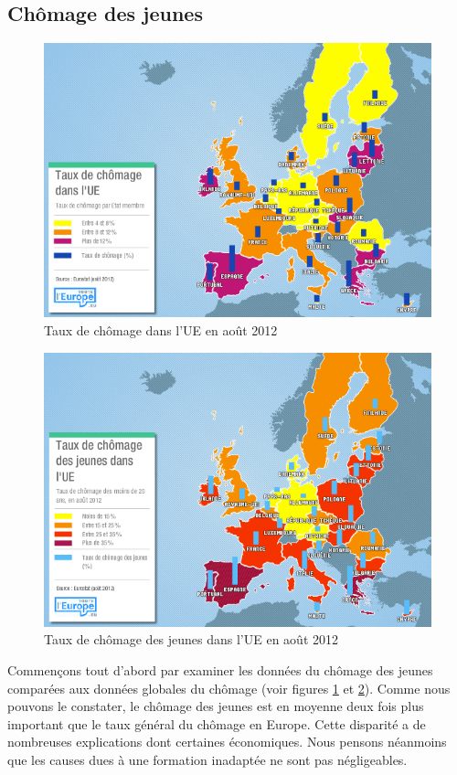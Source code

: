 \subsection{Chômage des jeunes}
\begin{figure}[p]
\centering
\includegraphics[width=0.98\linewidth]{../resources/illustrations/chom}
\caption{Taux de chômage dans l'UE en août 2012 \cite{chom}}
\label{chom}
\end{figure}
\begin{figure}[p]
\centering
\includegraphics[width=0.98\linewidth]{../resources/illustrations/chom_jeunes}
\caption{Taux de chômage des jeunes dans l'UE en août 2012 \cite{chom_jeunes}}
\label{chom_jeunes}
\end{figure}
Commençons tout d'abord par examiner les données du chômage des jeunes comparées aux données globales du chômage (voir figures \ref{chom} et \ref{chom_jeunes}). Comme nous pouvons le constater, le chômage des jeunes est en moyenne deux fois plus important que le taux général du chômage en Europe. Cette disparité a de nombreuses explications dont certaines économiques. Nous pensons néanmoins que les causes dues à une formation inadaptée ne sont pas négligeables. 

